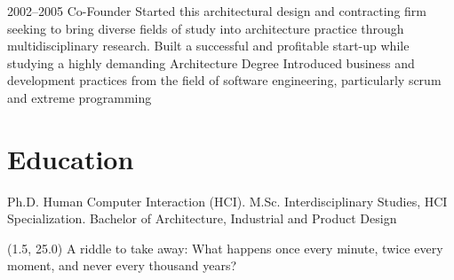 \documentclass[full]{rvca}
\begin{document}
{2002--2005}
{Co-Founder} %
{Started this architectural design and contracting firm seeking to bring diverse fields of study into architecture
practice through multidisciplinary research.} %
{Built a successful and profitable start-up while studying a highly demanding Architecture Degree}
{Introduced business and development practices from the field of software engineering, particularly scrum and extreme programming}
{}
{}
{}

\section{Education}

Ph.D. Human Computer Interaction (HCI).
M.Sc. Interdisciplinary Studies, HCI Specialization.
Bachelor of Architecture, Industrial and Product Design

\begin{textblock}{3.5}(1.5, 25.0)
\footnotesize \centering A riddle to take away: What happens once every minute, twice every moment, and never every thousand years?
\end{textblock}
\end{document}
